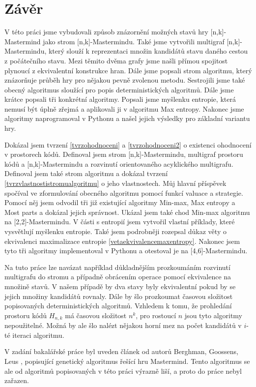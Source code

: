 \chapter*{Závěr}

V této práci jsme vybudovali způsob znázornění možných stavů hry [n,k]-Mastermind jako strom [n,k]-Mastermindu. Také jsme vytvořili multigraf [n,k]-Mastermindu, který slouží k reprezentaci množin kandidátů stavu daného cestou z počátečního stavu. Mezi těmito dvěma grafy jsme našli přímou spojitost plynoucí z ekvivalentní konstrukce hran. Dále jsme popsali strom algoritmu, který znázorňuje průběh hry pro nějakou pevně zvolenou metodu. Sestrojili jsme také obecný algoritmus sloužící pro popis deterministických algoritmů. Dále jsme krátce popsali tři konkrétní algoritmy. Popsali jsme myšlenku entropie, která nemusí být úplně zřejmá a aplikovali ji v algoritmu Max entropy. Nakonec jsme algoritmy naprogramoval v Pythonu a našel jejich výsledky pro základní variantu hry. 

Dokázal jsem tvrzení \ref{tvrzohodnoceni} a \ref{tvrzohodnoceni2} o existenci ohodnocení v prostorech kódů. Definoval jsem strom [n,k]-Mastermindu, multigraf prostoru kódů a [n,k]-Mastermindu a rozvinutí orientovaného acyklického multigrafu. Definoval jsem také strom algoritmu a dokázal tvrzení \ref{tvrzvlastnostistromualgoritmu} o jeho vlastnostech. Můj hlavní příspěvek spočíval ve zformulování obecného algoritmu pomocí funkcí valuace a strategie. Pomocí něj jsem odvodil tři již existující algoritmy Min-max, Max entropy a Most parts a dokázal jejich správnost. Ukázal jsem také chod Min-max algoritmu na [2,2]-Mastermindu. V části s entropií jsem vytvořil vlastní příklady, které vysvětlují myšlenku entropie. Také jsem podrobněji rozepsal důkaz věty o ekvivalenci maximalizace entropie \ref{vetaekvivalencemaxentropy}. Nakonec jsem tyto tři algoritmy implementoval v Pythonu a otestoval je na [4,6]-Mastermindu. 

Na tuto práce lze navázat například důkladnějším prozkoumáním rozvinutí multigrafu do stromu a případně obrácením operace pomocí ekvivalence na množině stavů. V našem případě by dva stavy byly ekvivalentní pokud by se jejich množiny kandidátů rovnaly. Dále by šlo prozkoumat časovou složitost popisovaných deterministických algoritmů. Vzhledem k tomu, že prohledání prostoru kódů $H_{n,k}$ má časovou složitost $n^k$, pro rostoucí $n$ jsou tyto algoritmy nepoužitelné. Možná by ale šlo nalézt nějakou horní mez na počet kandidátů v $i$-té iteraci algoritmu. 


V zadání bakalářské práce byl uveden článek od autorů Berghman, Goossens, Leus \cite{BERGHMAN20091880}, popisující genetický algoritmus řešící hru Mastermind. Tento algoritmus se ale od algoritmů popisovaných v této práci výrazně liší, a proto do práce nebyl zařazen. 

